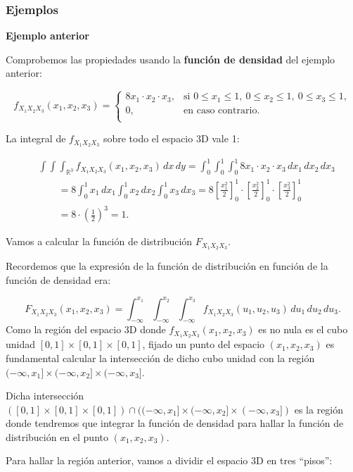 \documentclass[]{book}
\begin{document}
\hypertarget{ejemplos-10}{%
\subsubsection{Ejemplos}\label{ejemplos-10}}

\textbf{Ejemplo anterior}

Comprobemos las propiedades usando la \textbf{función de densidad} del ejemplo anterior:

\[
f_{X_1X_2X_3}(x_1,x_2,x_3)=\begin{cases}
8 x_1\cdot x_2\cdot x_3, & \mbox{si }0\leq x_1\leq 1,\ 0\leq x_2\leq 1,\ 0\leq x_3\leq 1, \\
0, & \mbox{en caso contrario.}\\
\end{cases}
\]

La integral de \(f_{X_1X_2X_3}\) sobre todo el espacio 3D vale 1:

\[
\begin{array}{rl}
& \int\int\int_{\mathbb{R}^3} f_{X_1X_2X_3}(x_1,x_2,x_3)\,dx\, dy=\int_0^1\int_0^1\int_0^1 8 x_1\cdot x_2\cdot x_3\, dx_1\,dx_2\,dx_3\\ & \qquad=8\int_0^1 x_1\, dx_1\int_0^1 x_2\, dx_2\int_0^1 x_3\,dx_3=8\left[\frac{x_1^2}{2}\right]_0^1\cdot\left[\frac{x_2^2}{2}\right]_0^1\cdot \left[\frac{x_3^2}{2}\right]_0^1\\
& \qquad = 8\cdot\left(\frac{1}{2}\right)^3 =1.
\end{array}
\]

Vamos a calcular la función de distribución \(F_{X_1X_2X_3}\).

Recordemos que la expresión de la función de distribución en función de la función de densidad era:

\[
F_{X_1X_2X_3}(x_1,x_2,x_3)=\int_{-\infty}^{x_1}\int_{-\infty}^{x_2}\int_{-\infty}^{x_3}f_{X_1X_2X_3}(u_1,u_2,u_3)\,du_1\, du_2\, du_3.
\]
Como la región del espacio 3D donde \(f_{X_1X_2X_3}(x_1,x_2,x_3)\) es no nula es el cubo unidad \([0,1]\times [0,1]\times [0,1]\), fijado un punto del espacio \((x_1,x_2,x_3)\) es fundamental calcular la intersección de dicho cubo unidad con la región \((-\infty,x_1]\times (-\infty,x_2]\times (-\infty,x_3]\).

Dicha intersección \(([0,1]\times [0,1]\times [0,1])\cap ((-\infty,x_1]\times (-\infty,x_2]\times (-\infty,x_3])\) es la región donde tendremos que integrar la función de densidad para hallar la función de distribución en el punto \((x_1,x_2,x_3)\).

Para hallar la región anterior, vamos a dividir el espacio 3D en tres ``pisos'':
\end{document}
